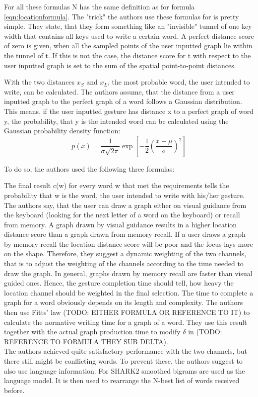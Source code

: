 For all these formulas N has the same definition as for formula \ref{eqn:locationformula}. The "trick" the authors use these formulas for is pretty simple. They state, that they form something like an "invisible" tunnel of one key width that contains all keys used to write a certain word. A perfect distance score of zero is given, when all the sampled points of the user inputted graph lie within the tunnel of t. If this is not the case, the distance score for t with respect to the user inputted graph is set to the sum of the spatial point-to-point distances.

With the two distances $x_S$ and $x_L$, the most probable word, the user intended to write, can be calculated. The authors assume, that the distance from a user inputted graph to the perfect graph of a word follows a Gaussian distribution. This means, if the user inputted gesture has distance x to a perfect graph of word y, the probability, that y is the intended word can be calculated using the Gaussian probability density function:
\begin{equation}
    p(x) = \frac{1}{\sigma\sqrt{2\pi}}\exp\left[{-\frac{1}{2}}\left(\frac{x-\mu}{\sigma}\right)^2\right]
\end{equation}

To do so, the authors used the following three formulas:


The final result c(w) for every word w that met the requirements tells the probability that w is the word, the user intended to write with his/her gesture.\\
The authors say, that the user can draw a graph either on visual guidance from the keyboard (looking for the next letter of a word on the keyboard) or recall from memory. A graph drawn by visual guidance results in a higher location distance score than a graph drawn from memory recall. If a user draws a graph by memory recall the location distance score will be poor and the focus lays more on the shape. Therefore, they suggest a dynamic weighting of the two channels, that is to adjust the weighting of the channels according to the time needed to draw the graph. In general, graphs drawn by memory recall are faster than visual guided ones. Hence, the gesture completion time should tell, how heavy the location channel should be weighted in the final selection. The time to complete a graph for a word obviously depends on its length and complexity. The authors then use Fitts' law (TODO: EITHER FORMULA OR REFERENCE TO IT) to calculate the normative writing time for a graph of a word. They use this result together with the actual graph production time to modify $\delta$ in (TODO: REFERENCE TO FORMULA THEY SUB DELTA).\\
The authors achieved quite satisfactory performance with the two channels, but there still might be conflicting words. To prevent these, the authors suggest to also use language information. For SHARK2 smoothed bigrams are used as the language model. It is then used to rearrange the N-best list of words received before.